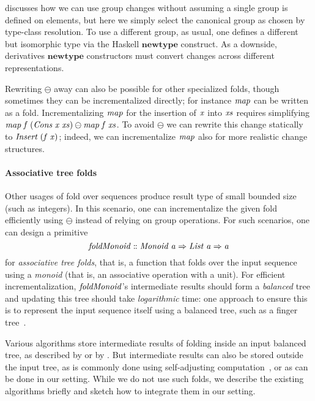  discusses how
we can use group changes without assuming a single group is defined on elements, but here we
simply select the canonical group as chosen by type-class resolution. To use a
different group, as usual, one defines a different but isomorphic type via the
Haskell \ensuremath{\mathbf{newtype}} construct. As a downside, derivatives \ensuremath{\mathbf{newtype}} constructors
must convert changes across different representations.

Rewriting \ensuremath{\ominus } away can also be possible for other specialized folds,
though sometimes they can be incrementalized directly; for
instance \ensuremath{\Varid{map}} can be written as a fold. Incrementalizing \ensuremath{\Varid{map}} for the
insertion of \ensuremath{\Varid{x}} into \ensuremath{\Varid{xs}} requires simplifying \ensuremath{\Varid{map}\;\Varid{f}\;(\Conid{Cons}\;\Varid{x}\;\Varid{xs})\ominus \Varid{map}\;\Varid{f}\;\Varid{xs}}. To avoid \ensuremath{\ominus } we can rewrite this change statically to \ensuremath{\Conid{Insert}\;(\Varid{f}\;\Varid{x})}; indeed, we can incrementalize \ensuremath{\Varid{map}} also for more realistic change structures.

\paragraph{Associative tree folds}
Other usages of fold over sequences produce result type of small bounded size
(such as integers). In this scenario, one can incrementalize the given fold
efficiently using \ensuremath{\ominus } instead of relying on group operations.
For such scenarios, one can design a primitive
\[\mathit{foldMonoid}\mathrel{:\mkern-1mu:}\mathit{Monoid}\;\mathit{a}\Rightarrow\mathit{List}\;\mathit{a}\Rightarrow\mathit{a}\]
for \emph{associative tree folds}, that is, a function that folds
over the input sequence using a \emph{monoid} (that is, an associative operation
with a unit). For efficient incrementalization, \ensuremath{\Varid{foldMonoid}}'s intermediate
results should form a \emph{balanced} tree and
updating this tree should take \emph{logarithmic} time: one approach to ensure
this is to represent the input sequence itself using a balanced tree, such as a
finger tree~\citep{hinze2006finger}.

Various algorithms store intermediate results of folding
inside an input balanced tree, as described by \citet[Ch.~14]{Cormen2001} or by
\citet{hinze2006finger}. But intermediate results can also be stored outside the
input tree, as is commonly done using self-adjusting
computation~\citep[Sec.~9.1]{Acar05}, or as can be done in our setting.
While we do not use such folds, we describe the existing algorithms briefly and
sketch how to integrate them in our setting.

